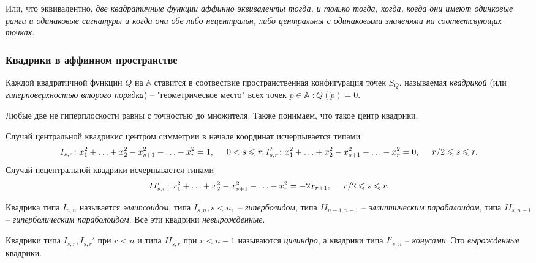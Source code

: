 Или, что эквивалентно, \textit{две квадратичные функции аффинно эквиваленты тогда, и только тогда, когда, когда они имеют одинковые ранги и одинаковые сигнатуры и когда они обе либо нецентральн, либо центральны с одинаковыми значенями на соответсвующих точках.}


\subsubsection{Квадрики в аффинном пространстве}

\begin{to_def} 
    Каждой квадратичной функции $Q$ на $\mathbb{A}$ ставится в соотвествие пространственная конфигурация точек $S_Q$, называемая \textit{квадрикой} (или \textit{гиперповерхностью второго порядка}) -- "геометрическое место" всех точек $\dot p \in \mathbb{A}$ $\colon Q(\dot p) = 0$. 
\end{to_def}


Любые две не гиперплоскости равны с точностью до множителя. Также понимаем, что такое центр квадрики.

\begin{to_thr} 
    Случай центральной квадрикис центром симметрии в начале координат исчерпывается типами
    $$
        I_{s, r} \colon x_1^2 + \ldots  + x_2^2 - x_{s+1}^2 - \ldots  - x_r^2 = 1, 
        \hspace{0.5cm} 0 < s \leq r;
        I_{s, r}' \colon x_1^2 + \ldots  + x_2^2 - x_{s+1}^2 - \ldots  - x_r^2 = 0, 
        \hspace{0.5cm} r/2 \leq s \leq r.
    $$
    Случай нецентральной квадрики исчерпывается типами
    $$
        II_{s, r}' \colon x_1^2 + \ldots  + x_2^2 - x_{s+1}^2 - \ldots  - x_r^2 = -2 x_{r+1}, 
        \hspace{0.5cm} r/2 \leq s \leq r.
    $$

\end{to_thr}


\begin{to_def} 
    Квадрика типа $I_{n, n}$ называется \textit{эллипсоидом}, типа $I_{s, n}, s < n,$ -- \textit{гиперболидом}, типа $II_{n-1, n-1}$ -- \textit{эллиптическим парабалоидом}, типа $II_{s, n-1}$ -- \textit{гиперболическим параболоидом}. Все эти квадрики \textit{невырожденные}.

    Квадрики типа $I_{s, r}, I_{s, r}'$ при $r < n$ и типа $II_{s, r}$ при $r < n-1$ называются \textit{цилиндро}, а квадрики типа $I'_{s, n}$ -- \textit{конусами}. Это \textit{вырожденные} квадрики. 
\end{to_def}